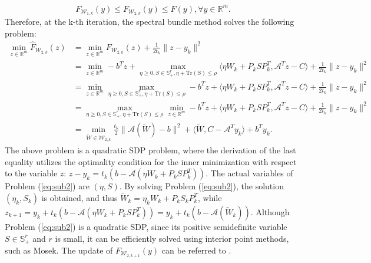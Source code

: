 \documentclass{jcmlatex}
\begin{document}
\begin{equation*}
F_{\mathcal{W}_{1,k}}(y)\leq F_{\mathcal{W}_{2,k}}(y)\leq F(y),\forall y\in \mathbb{R}^{m}.
\end{equation*}
Therefore, at the k-th iteration, the spectral bundle method solves the following problem:
\begin{equation}\label{eq:sub2}
\begin{aligned}
\underset{z\in\mathbb{R}^{m}}{\min}\hat{F}_{\mathcal{W}_{2,k}}(z)&=\underset{z\in\mathbb{R}^{m}}{\min}F_{\mathcal{W}_{2,k}}(z)+\frac{1}{2t_{k}}\|z-y_{k}\|^{2}\\
&=\underset{z\in\mathbb{R}^{m}}{\min}-b^{T}z+\underset{\eta\geq0,S\in \mathbb{S}^r_+,\eta+\text{Tr}(S) \leq \rho}{\max}\langle\eta W_{k} + P_{k}SP_{k}^T, \mathcal{A}^{T}z-C\rangle+\frac{1}{2t_{k}}\|z-y_{k}\|^{2}\\
&=\underset{z\in\mathbb{R}^{m}}{\min}\underset{\eta\geq0,S\in \mathbb{S}^r_+,\eta+\text{Tr}(S) \leq \rho}{\max}-b^{T}z+\langle\eta W_{k} + P_{k}SP_{k}^T, \mathcal{A}^{T}z-C\rangle+\frac{1}{2t_{k}}\|z-y_{k}\|^{2}\\ 
&=\underset{\eta\geq0,S\in \mathbb{S}^r_+,\eta+\text{Tr}(S) \leq \rho}{\max}\underset{z\in\mathbb{R}^{m}}{\min}-b^{T}z+\langle\eta W_{k} + P_{k}SP_{k}^T, \mathcal{A}^{T}z-C\rangle+\frac{1}{2t_{k}}\|z-y_{k}\|^{2}\\ 
&=\underset{\tilde{W}\in \mathcal{W}_{2,k}}{\min}\frac{t_{k}}{2}\| \mathcal{A}(\tilde{W})-b\|^{2}+\langle \tilde{W}, C-\mathcal{A}^{T}y_{k}\rangle+b^{T}y_{k}.
\end{aligned}
\end{equation} 
The above problem is a quadratic SDP problem, where the derivation of the last equality utilizes the optimality condition for the inner minimization with respect to the variable \(z\): \(z - y_k = t_k(b - \mathcal{A}(\eta W_k + P_k S P_k^T))\). The actual variables of Problem (\ref{eq:sub2}) are \((\eta, S)\). By solving Problem (\ref{eq:sub2}), the solution \((\eta_k, S_k)\) is obtained, and thus \(\tilde{W}_k = \eta_k W_k + P_k S_k P_k^T\), while \(z_{k+1} = y_k + t_k(b - \mathcal{A}(\eta W_k + P_k S P_k^T)) = y_k + t_k(b - \mathcal{A}(\tilde{W}_k))\). Although Problem (\ref{eq:sub2}) is a quadratic SDP, since its positive semidefinite variable \(S \in \mathbb{S}_+^r\) and \(r\) is small, it can be efficiently solved using interior point methods, such as Mosek. The update of \(F_{\mathcal{W}_{2,k+1}}(y)\) can be referred to \cite{helmberg2000spectral,ding2023revisiting,liao2023overview}. 
\end{document}
